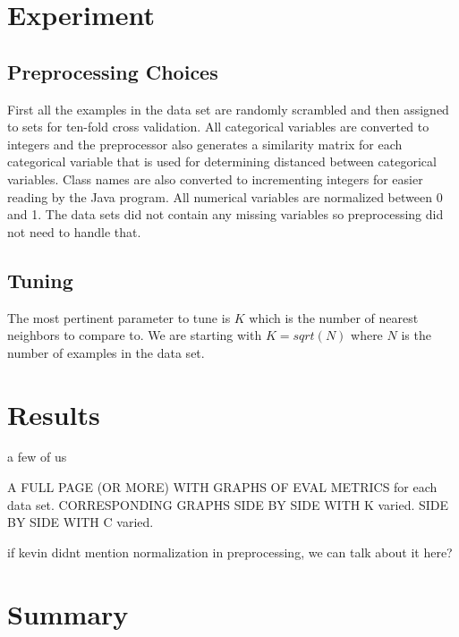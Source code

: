 \documentclass[twoside,11pt]{article}
\begin{document}
\section{Experiment}

\subsection{Preprocessing Choices}

First all the examples in the data set are randomly scrambled and then assigned to sets for ten-fold cross validation. All categorical variables are converted to integers and the preprocessor also generates a similarity matrix for each categorical variable that is used for determining distanced between categorical variables. Class names are also converted to incrementing integers for easier reading by the Java program. All numerical variables are normalized between 0 and 1. The data sets did not contain any missing variables so preprocessing did not need to handle that. 

\subsection{Tuning}

The most pertinent parameter to tune is $K$ which is the number of nearest neighbors to compare to. We are starting with $K = sqrt(N)$ where $N$ is the number of examples in the data set. 

\section{Results}

a few of us

A FULL PAGE (OR MORE) WITH GRAPHS OF EVAL METRICS for each data set. CORRESPONDING GRAPHS SIDE BY SIDE WITH K varied. SIDE BY SIDE WITH C varied.

if kevin didnt mention normalization in preprocessing, we can talk about it here?

\section{Summary}




\end{document}
